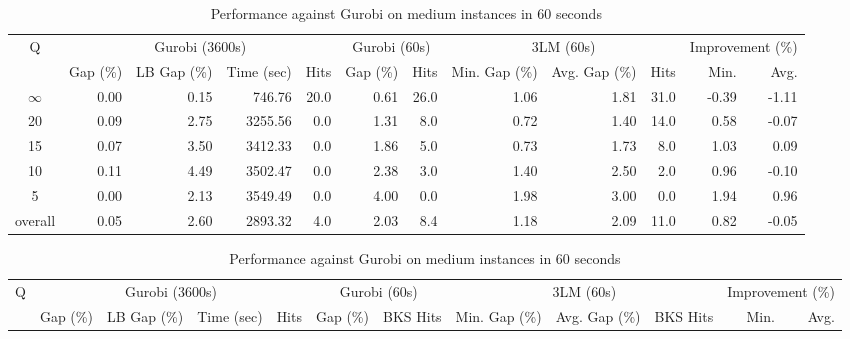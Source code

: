 \begin{table}[H]
\centering
\caption{Performance against Gurobi on medium instances in 60 seconds}
\label{tab:3lm_resuts150T60}
\begin{tabular}{c rrrr rr rrr rr}
\toprule
       Q & \multicolumn{4}{c}{Gurobi (3600s)} & \multicolumn{2}{c}{Gurobi (60s)} & \multicolumn{3}{c}{3LM (60s)} & \multicolumn{2}{c}{Improvement (\%)} \\
         &       Gap (\%) & LB Gap (\%) & Time (sec) & Hits &     Gap (\%) & Hits & Min. Gap (\%) & Avg. Gap (\%) & Hits &             Min. &  Avg. \\
\cmidrule(lr){1-1} \cmidrule(lr){2-5} \cmidrule(lr){2-5} \cmidrule(lr){6-7} \cmidrule(lr){8-10} \cmidrule(lr){11-12}
$\infty$ &           0.00 &        0.15 &     746.76 & 20.0 &         0.61 & 26.0 &          1.06 &          1.81 & 31.0 &            -0.39 & -1.11 \\
      20 &           0.09 &        2.75 &    3255.56 &  0.0 &         1.31 &  8.0 &          0.72 &          1.40 & 14.0 &             0.58 & -0.07 \\
      15 &           0.07 &        3.50 &    3412.33 &  0.0 &         1.86 &  5.0 &          0.73 &          1.73 &  8.0 &             1.03 &  0.09 \\
      10 &           0.11 &        4.49 &    3502.47 &  0.0 &         2.38 &  3.0 &          1.40 &          2.50 &  2.0 &             0.96 & -0.10 \\
       5 &           0.00 &        2.13 &    3549.49 &  0.0 &         4.00 &  0.0 &          1.98 &          3.00 &  0.0 &             1.94 &  0.96 \\
\midrule
 overall &           0.05 &        2.60 &    2893.32 &  4.0 &         2.03 &  8.4 &          1.18 &          2.09 & 11.0 &             0.82 & -0.05 \\
\bottomrule
\end{tabular}
\end{table}\begin{table}[H]
\centering
\caption{Performance against Gurobi on medium instances in 60 seconds}
\label{tab:3lm_resuts150T60}
\begin{tabular}{c rrrr rr rrr rr}
\toprule
       Q & \multicolumn{4}{c}{Gurobi (3600s)} & \multicolumn{2}{c}{Gurobi (60s)} & \multicolumn{3}{c}{3LM (60s)} & \multicolumn{2}{c}{Improvement (\%)} \\
         &       Gap (\%) & LB Gap (\%) & Time (sec) & Hits &     Gap (\%) & BKS Hits & Min. Gap (\%) & Avg. Gap (\%) & BKS Hits &             Min. &  Avg. \\

\end{tabular}
\end{table}
